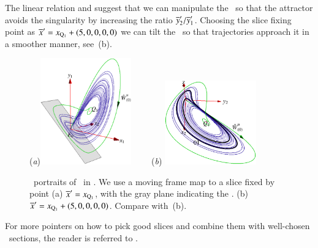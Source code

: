 \documentclass[preprint,number,sort&compress]{elsarticle}
\begin{document}
The linear relation  and
 suggest that we can manipulate the
\sset\ so that the attractor avoids the singularity by
increasing the ratio ${\overline{y}'_{2}}/{\overline{y}'_{1}}$.
Choosing the slice fixing point as
${\overline{x}'}=x_{\mathrm{Q}_{1}}+(5,0,0,0,0)$
we can tilt the \sset\ so that trajectories approach it in a
smoother manner, see \,(b).
\begin{figure}[ht]
\begin{center}
  (\textit{a})\includegraphics[width=0.35\textwidth,clip=true]{CLEmfReqb234}
~~~~(\textit{b})%
\includegraphics[width=0.35\textwidth,clip=true]{CLEmfAdHoc245}
\end{center}
\caption{
\Statesp\ portraits of \cLf\ in \reducedsp. We use a
moving frame map to a slice fixed by point
(a) ${\overline{x}'}  = x_{\mathrm{Q}_{1}}$, with
the gray plane indicating the \sset.
(b) ${\overline{x}'}  = x_{\mathrm{Q}_{1}}+(5,0,0,0,0)$. Compare with \,(b).
    }\label{fig:CLEmfsset}
\end{figure}
%

For more pointers on how to pick good slices and combine them
with well-chosen \Poincare\ sections, the reader is referred to
.
\end{document}
